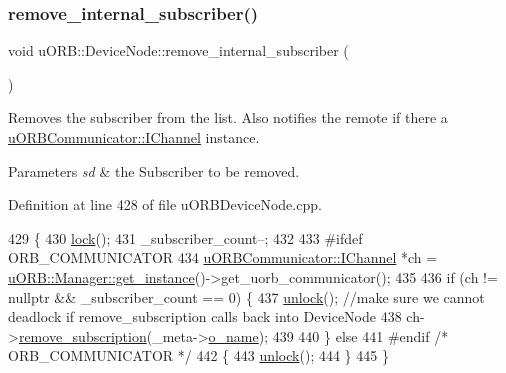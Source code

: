 \subsubsection{\texorpdfstring{remove\+\_\+internal\+\_\+subscriber()}{remove\_internal\_subscriber()}}
{\footnotesize\ttfamily void u\+O\+R\+B\+::\+Device\+Node\+::remove\+\_\+internal\+\_\+subscriber (\begin{DoxyParamCaption}{ }\end{DoxyParamCaption})}

Removes the subscriber from the list. Also notifies the remote if there a \hyperlink{classuORBCommunicator_1_1IChannel}{u\+O\+R\+B\+Communicator\+::\+I\+Channel} instance. 
\begin{DoxyParams}{Parameters}
{\em sd} & the Subscriber to be removed. \\
\hline
\end{DoxyParams}


Definition at line 428 of file u\+O\+R\+B\+Device\+Node.\+cpp.


\begin{DoxyCode}
429 \{
430     \hyperlink{classcdev_1_1CDev_ae676cccee31dd393ab681414a146d868}{lock}();
431     \_subscriber\_count--;
432 
433 \textcolor{preprocessor}{#ifdef ORB\_COMMUNICATOR}
434     \hyperlink{classuORBCommunicator_1_1IChannel}{uORBCommunicator::IChannel} *ch = 
      \hyperlink{classuORB_1_1Manager_a9d829b3ea49d16d03c2fa37ef2bb24a5}{uORB::Manager::get\_instance}()->get\_uorb\_communicator();
435 
436     \textcolor{keywordflow}{if} (ch != \textcolor{keyword}{nullptr} && \_subscriber\_count == 0) \{
437         \hyperlink{classcdev_1_1CDev_af65273e0578b277deea057dc7d558e9d}{unlock}(); \textcolor{comment}{//make sure we cannot deadlock if remove\_subscription calls back into DeviceNode}
438         ch->\hyperlink{classuORBCommunicator_1_1IChannel_a74420541552346f0367d802b5c61714a}{remove\_subscription}(\_meta->\hyperlink{structorb__metadata_a54d1751f24aa0c1f24934c6712811e58}{o\_name});
439 
440     \} \textcolor{keywordflow}{else}
441 \textcolor{preprocessor}{#endif }\textcolor{comment}{/* ORB\_COMMUNICATOR */}\textcolor{preprocessor}{}
442     \{
443         \hyperlink{classcdev_1_1CDev_af65273e0578b277deea057dc7d558e9d}{unlock}();
444     \}
445 \}
\end{DoxyCode}
\mbox{\label{classuORB_1_1DeviceNode_aa4a59b86caeebbdf513dd60fcee1f5ba}} 
